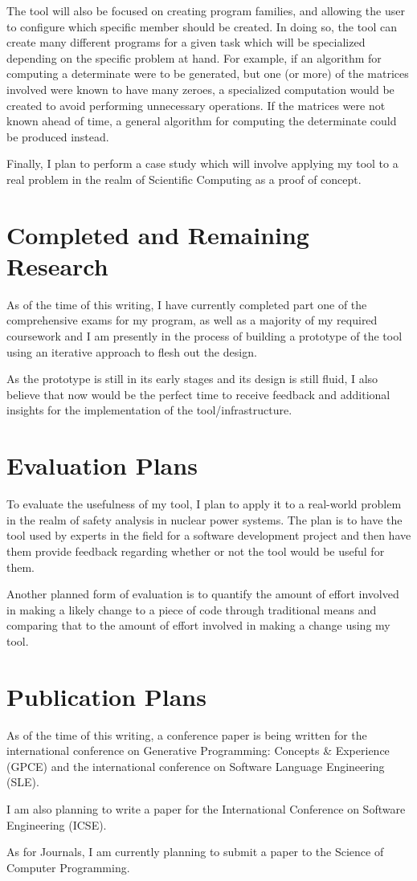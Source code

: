 \documentclass[11pt]{article} %
\begin{document}
The tool will also be focused on creating program families, and allowing the
user to configure which specific member should be created. In doing so, the tool
can create many different programs for a given task which will be specialized
depending on the specific problem at hand. For example, if an algorithm for
computing a determinate were to be generated, but one (or more) of the matrices
involved were known to have many zeroes, a specialized computation would be
created to avoid performing unnecessary operations. If the matrices were not
known ahead of time, a general algorithm for computing the determinate could be
produced instead.

Finally, I plan to perform a case study which will involve applying my tool to
a real problem in the realm of Scientific Computing as a proof of concept.

\section{Completed and Remaining Research}

As of the time of this writing, I have currently completed part one of the
comprehensive exams for my program, as well as a majority of my required
coursework and I am presently in the process of building a prototype of the tool
using an iterative approach to flesh out the design.

As the prototype is still in its early stages and its design is still fluid, I
also believe that now would be the perfect time to receive feedback and 
additional insights for the implementation of the tool/infrastructure.

\section{Evaluation Plans}

To evaluate the usefulness of my tool, I plan to apply it to a real-world
problem in the realm of safety analysis in nuclear power systems. The plan is to
have the tool used by experts in the field for a software development project
and then have them provide feedback regarding whether or not the tool would be
useful for them.

Another planned form of evaluation is to quantify the amount of effort
involved in making a likely change to a piece of code through traditional means
and comparing that to the amount of effort involved in making a change using my
tool.

\section{Publication Plans}

As of the time of this writing, a conference paper is being written for 
the international conference on Generative Programming: Concepts \& Experience
(GPCE) and the international conference on Software Language Engineering (SLE).

I am also planning to write a paper for the International Conference on Software
Engineering (ICSE).

As for Journals, I am currently planning to submit a paper to the
Science of Computer Programming.
\end{document}
